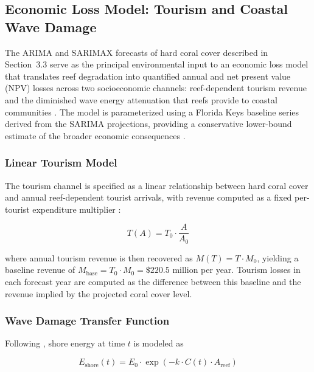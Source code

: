 \documentclass[10pt,letterpaper]{article}
\begin{document}
\subsection{Economic Loss Model: Tourism and Coastal Wave Damage}

The ARIMA and SARIMAX forecasts of hard coral cover described in Section~3.3 serve as the principal environmental input to an economic loss model that translates reef degradation into quantified annual and net present value (NPV) losses across two socioeconomic channels: reef-dependent tourism revenue and the diminished wave energy attenuation that reefs provide to coastal communities \cite{cesar_beukering_2004, spalding_tourism_2017}. The model is parameterized using a Florida Keys baseline series derived from the SARIMA projections, providing a conservative lower-bound estimate of the broader economic consequences \cite{ferrario_2014, storlazzi_2019}.

\subsubsection{Linear Tourism Model}

The tourism channel is specified as a linear relationship between hard coral cover and annual reef-dependent tourist arrivals, with revenue computed as a fixed per-tourist expenditure multiplier \cite{spalding_tourism_2017}:

\begin{equation}
T(A) = T_0 \cdot \frac{A}{A_0}
\end{equation}

\noindent where annual tourism revenue is then recovered as $M(T) = T \cdot M_0$, yielding a baseline revenue of $M_{\text{base}} = T_0 \cdot M_0 = \$220.5$ million per year. Tourism losses in each forecast year are computed as the difference between this baseline and the revenue implied by the projected coral cover level.

\subsubsection{Wave Damage Transfer Function}

Following \cite{ferrario_2014, storlazzi_2019}, shore energy at time $t$ is modeled as

\begin{equation}
E_{\text{shore}}(t) = E_0 \cdot \exp\!\left(-k \cdot C(t) \cdot A_{\text{reef}}\right)
\end{equation}
\end{document}

